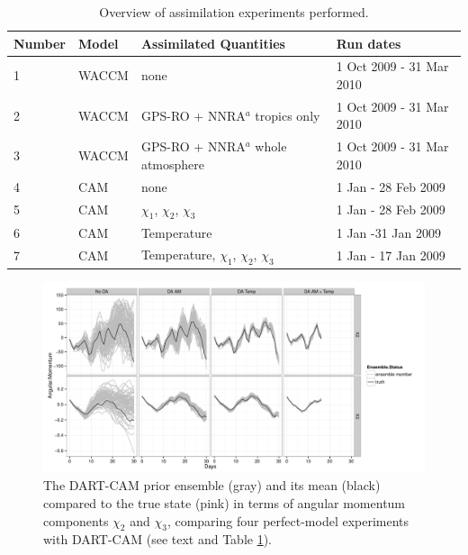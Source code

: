 \begin{table}
\caption{Overview of assimilation experiments performed.}
\centering
\begin{tabular}{p{2cm}p{2cm}p{6cm}p{4cm}}
	Number & Model &  Assimilated Quantities  & Run dates \\
\hline
1 & WACCM &	none   & 1 Oct 2009 - 31 Mar 2010	\\
2 & WACCM &	GPS-RO + NNRA$^a$ tropics only & 1 Oct 2009 - 31 Mar 2010	\\
3 & WACCM &	GPS-RO + NNRA$^a$ whole atmosphere  & 1 Oct 2009 - 31 Mar 2010	\\
4 & CAM	&	none &  1 Jan - 28 Feb 2009 \\
5 & CAM &	$\chi_1$, $\chi_2$, $\chi_3$ & 1 Jan - 28 Feb 2009 \\
6 & CAM &	Temperature	& 1 Jan -31 Jan 2009	\\
7 & CAM &	Temperature, $\chi_1$, $\chi_2$, $\chi_3$ & 1 Jan - 17 Jan 2009\\
\hline
\end{tabular}
\label{tab:expts}
\end{table}
\clearpage



\begin{figure}[p]
\includegraphics[width=\textwidth]{Paper_figures/ERPDA_paper_erpda_obs_space.pdf} 
\caption{ The DART-CAM prior ensemble (gray) and its mean (black) compared to the true state (pink) in terms of angular momentum components $\chi_2$ and $\chi_3$, comparing four perfect-model experiments with DART-CAM (see text and Table \ref{tab:expts}).  }
 \label{fig:fit_to_ERPs}
\end{figure}

